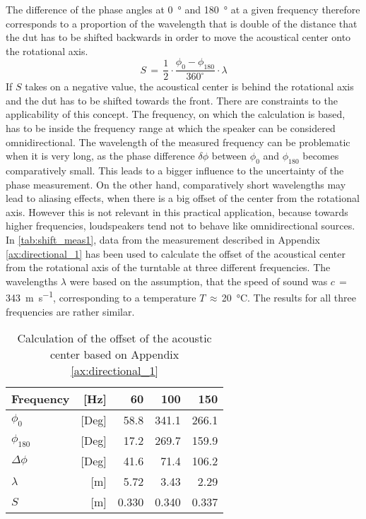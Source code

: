 The difference of the phase angles at \SI{0}{\degree} and \SI{180}{\degree} at a given frequency therefore corresponds to a proportion of the wavelength that is double of the distance that the \gls{dut} has to be shifted backwards in order to move the acoustical center onto the rotational axis.
\begin{equation}
S\,=\,\frac{1}{2}\cdot\frac{\phi_0-\phi_{180}}{360^\circ}\cdot\lambda
\end{equation}
\startexplain
\stopexplain    
If \(S\) takes on a negative value, the acoustical center is behind the rotational axis and the \gls{dut} has to be shifted towards the front. There are constraints to the applicability of this concept. The frequency, on which the calculation is based, has to be inside the frequency range at which the speaker can be considered omnidirectional.
The wavelength of the measured frequency can be problematic when it is very long, as the phase difference \(\delta\phi\) between \(\phi_0\) and \(\phi_{180}\) becomes comparatively small. This leads to a bigger influence to the uncertainty of the phase measurement. On the other hand, comparatively short wavelengths may lead to aliasing effects, when there is a big offset of the center from the rotational axis. However this is not relevant in this practical application, because towards higher frequencies, loudspeakers tend not to behave like omnidirectional sources.\\
In \autoref{tab:shift_meas1}, data from the measurement described in Appendix \ref{ax:directional_1} has been used to calculate the offset of the acoustical center from the rotational axis of the turntable at three different frequencies. The wavelengths \(\lambda\) were based on the assumption, that the speed of sound was \(c\,=\,\)\SI{343}{\meter\per\second}, corresponding to a temperature \(T\,\approx\,\)\SI{20}{\celsius}. The results for all three frequencies are rather similar.
\begin{table}[H]
\centering
\caption{Calculation of the offset of the acoustic center based on Appendix \ref{ax:directional_1}}
\label{tab:shift_meas1}
\begin{tabular}{|lr|r|r|r|}
\hline
Frequency              & {[}Hz{]}  & 60    & 100    & 150    \\ \hline
\(\phi_0\)             & {[}Deg{]} & 58.8  & 341.1  & 266.1  \\ \hline
\(\phi_{180}\)         & {[}Deg{]} & 17.2  & 269.7  & 159.9  \\ \hline
\(\Delta\phi\)         & {[}Deg{]} & 41.6  & 71.4   & 106.2  \\ \hline
\(\lambda\)            & {[}m{]}   & 5.72  & 3.43   & 2.29   \\ \hline
\(S\)                  & {[}m{]}   & 0.330 & 0.340  & 0.337  \\ \hline
\end{tabular}
\end{table}
